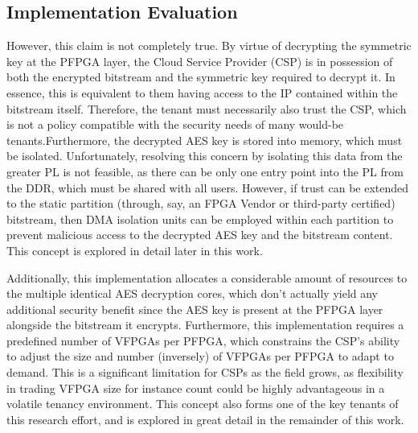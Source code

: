 \subsection{Implementation Evaluation}\label{subsec:LitEval}
However, this claim is not completely true. By virtue of decrypting the symmetric key at the PFPGA layer, the Cloud Service Provider (CSP) is in possession of both the encrypted bitstream and the symmetric key required to decrypt it. In essence, this is equivalent to them having access to the IP contained within the bitstream itself. Therefore, the tenant must necessarily also trust the CSP, which is not a policy compatible with the security needs of many would-be tenants.Furthermore, the decrypted AES key is stored into memory, which must be isolated. Unfortunately, resolving this concern by isolating this data from the greater PL is not feasible, as there can be only one entry point into the PL from the DDR, which must be shared with all users. However, if trust can be extended to the static partition (through, say, an FPGA Vendor or third-party certified) bitstream, then DMA isolation units can be employed within each partition to prevent malicious access to the decrypted AES key and the bitstream content. This concept is explored in detail later in this work.

Additionally, this implementation allocates a considerable amount of resources to the multiple identical AES decryption cores, which don't actually yield any additional security benefit since the AES key is present at the PFPGA layer alongside the bitstream it encrypts. Furthermore, this implementation requires a predefined number of VFPGAs per PFPGA, which constrains the CSP's ability to adjust the size and number (inversely) of VFPGAs per PFPGA to adapt to demand. This is a significant limitation for CSPs as the field grows, as flexibility in trading VFPGA size for instance count could be highly advantageous in a volatile tenancy environment. This concept also forms one of the key tenants of this research effort, and is explored in great detail in the remainder of this work.